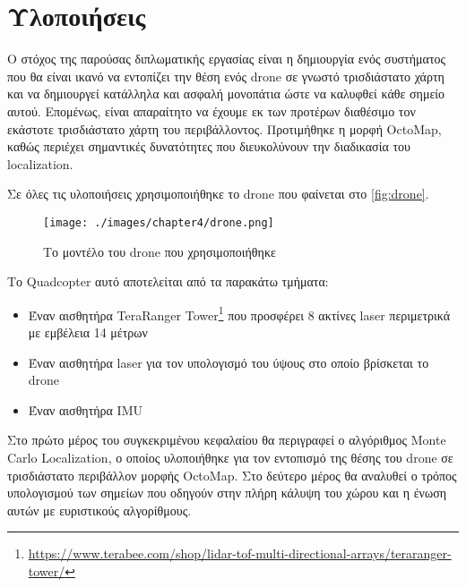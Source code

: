 \chapter{Υλοποιήσεις}
\label{chapter:implementations}

Ο στόχος της παρούσας διπλωματικής εργασίας είναι η δημιουργία ενός συστήματος που θα είναι ικανό να εντοπίζει την θέση ενός drone σε γνωστό τρισδιάστατο χάρτη και να δημιουργεί κατάλληλα και ασφαλή μονοπάτια ώστε να καλυφθεί κάθε σημείο αυτού. Επομένως, είναι απαραίτητο να έχουμε εκ των προτέρων διαθέσιμο τον εκάστοτε τρισδιάστατο χάρτη του περιβάλλοντος. Προτιμήθηκε η μορφή OctoMap, καθώς περιέχει σημαντικές δυνατότητες που διευκολύνουν την διαδικασία του localization.

Σε όλες τις υλοποιήσεις χρησιμοποιήθηκε το drone που φαίνεται στο \autoref{fig:drone}.

\begin{figure}[!ht]
    \centering
    \texttt{[image: ./images/chapter4/drone.png]}
    \caption{Το μοντέλο του drone που χρησιμοποιήθηκε} 
    \label{fig:drone}
\end{figure}

Το Quadcopter αυτό αποτελείται από τα παρακάτω τμήματα:
\begin{itemize}
        \item {Έναν αισθητήρα TeraRanger Tower\footnote{\href{https://www.terabee.com/shop/lidar-tof-multi-directional-arrays/teraranger-tower/}{https://www.terabee.com/shop/lidar-tof-multi-directional-arrays/teraranger-tower/}} που προσφέρει 8 ακτίνες laser περιμετρικά με εμβέλεια 14 μέτρων}
    \item{Έναν αισθητήρα laser για τον υπολογισμό του ύψους στο οποίο βρίσκεται το drone}
    \item{Έναν αισθητήρα IMU}
\end{itemize}

Στο πρώτο μέρος του συγκεκριμένου κεφαλαίου θα περιγραφεί ο αλγόριθμος Monte Carlo Localization, ο οποίος υλοποιήθηκε για τον εντοπισμό της θέσης του drone σε τρισδιάστατο περιβάλλον μορφής OctoMap. Στο δεύτερο μέρος θα αναλυθεί ο τρόπος υπολογισμού των σημείων που οδηγούν στην πλήρη κάλυψη του χώρου και η ένωση αυτών με ευριστικούς αλγορίθμους.





